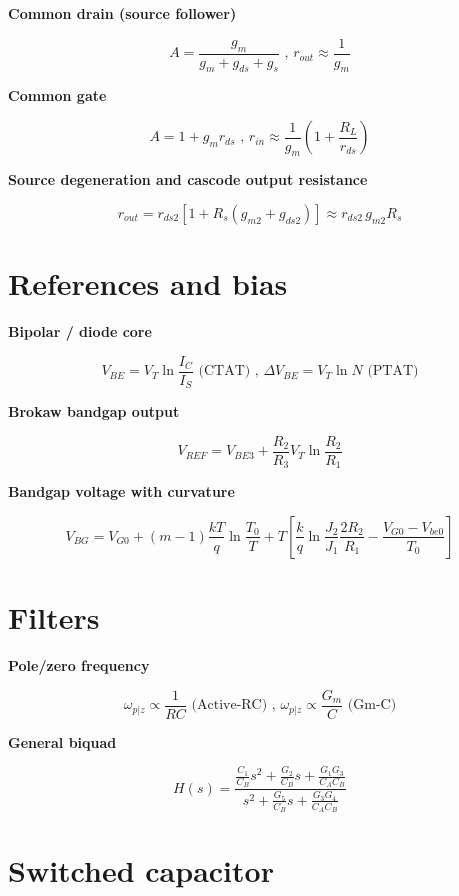 \textbf{Common drain (source follower)}

\[ A = \frac{g_m}{g_m + g_{ds} + g_s} \text{ , } r_{out} \approx \frac{1}{g_m} \]

\textbf{Common gate}

\[ A = 1 + g_m r_{ds} \text{ , } r_{in} \approx \frac{1}{g_m}\left(1 + \frac{R_L}{r_{ds}}\right) \]

\textbf{Source degeneration and cascode output resistance}

\[ r_{out} = r_{ds2}\left[1 + R_s(g_{m2} + g_{ds2})\right] \approx r_{ds2}\, g_{m2} R_s \]

\section{References and bias}\label{references-and-bias}

\textbf{Bipolar / diode core}

\[ V_{BE} = V_T \ln\frac{I_C}{I_S} \text{ (CTAT)} \text{ , } \Delta V_{BE} = V_T \ln N \text{ (PTAT)} \]

\textbf{Brokaw bandgap output}

\[ V_{REF} = V_{BE3} + \frac{R_2}{R_3} V_T \ln\frac{R_2}{R_1} \]

\textbf{Bandgap voltage with curvature}

\[ V_{BG} = V_{G0} + (m-1)\frac{kT}{q}\ln{\frac{T_0}{T}} + T\left[\frac{k}{q}\ln{\frac{J_2}{J_1}}\frac{2R_2}{R_1} - \frac{V_{G0} - V_{be0}}{T_0}\right] \]

\section{Filters}\label{filters}

\textbf{Pole/zero frequency}

\[ \omega_{p\vert z} \propto \frac{1}{RC} \text{ (Active-RC)} \text{ , } \omega_{p\vert z} \propto \frac{G_m}{C} \text{ (Gm-C)} \]

\textbf{General biquad}

\[ H(s) = \frac{\frac{C_1}{C_B}s^2 + \frac{G_2}{C_B}s + \frac{G_1G_3}{C_A C_B}}{s^2 + \frac{G_5}{C_B}s + \frac{G_3 G_4}{C_A C_B}} \]

\section{Switched capacitor}\label{switched-capacitor}

